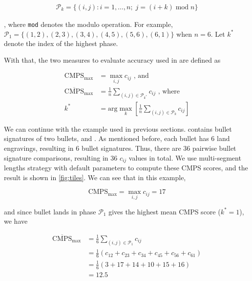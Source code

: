 \begin{align}
\mathcal{P}_k = \{ (i,j): i = 1, \dots, n ; \; j = (i + k) \;\mathrm{mod}\; n \}
\end{align}

, where \texttt{mod} denotes the modulo operation. For example,
\(\mathcal{P}_1 = \{ (1,2), (2,3), (3,4), (4,5), (5,6), (6,1) \}\) when
\(n = 6\). Let \(k^*\) denote the index of the highest phase.

With that, the two measures to evaluate accuracy used in \citet{cmps}
are defined as

\begin{align}
\mathrm{CMPS_{max}} &= \max_{i,j} c_{ij} \text{ , and} \\
\mathrm{\overline{CMPS}_{max}} &= \frac{1}{n} \sum_{(i,j) \in \mathcal{P}_{k^*}} c_{ij} \text{ , where} \\
k^* &= \text{arg}\max\limits_{k} \left[  \frac{1}{n} \sum_{(i,j) \in \mathcal{P}_k} c_{ij}\right]
\end{align}

We can continue with the example used in previous sections.
 contains bullet signatures of two bullets, 
and . As mentioned before, each bullet has 6 land
engravings, resulting in 6 bullet signatures. Thus, there are 36
pairwise bullet signature comparisons, resulting in 36 \(c_{ij}\) values
in total. We use multi-segment lengths strategy with default parameters
to compute these CMPS scores, and the result is shown in
\autoref{fig:tiles}. We can see that in this example,

\[
\mathrm{CMPS_{max}} =  \max_{i,j} c_{ij} = 17
\]

and since bullet lands in phase \(\mathcal{P}_1\) gives the highest mean
CMPS score (\(k^* = 1\)), we have

\[
\begin{aligned}
\mathrm{\overline{CMPS}_{max}} &= \frac{1}{6} \sum_{(i,j) \in \mathcal{P}_1} c_{ij} \\
                        &= \frac{1}{6} (c_{12} + c_{23} + c_{34} + c_{45} + c_{56} + c_{61}) \\
                        &= \frac{1}{6} (3+17+14+10+15+16) \\
                        &= 12.5
\end{aligned}
\]

